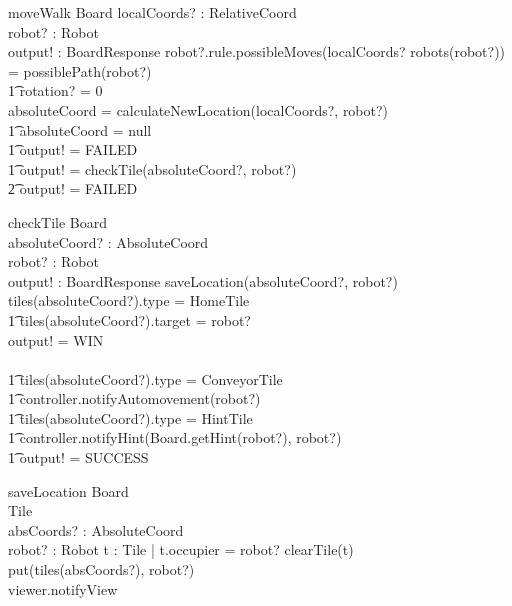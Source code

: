 \documentclass[a4paper,11pt]{article}
\begin{document}
\begin{schema}{moveWalk}
\Delta Board
localCoords? : RelativeCoord \\
robot? : Robot \\
output! : BoardResponse
\where
\IF robot?.rule.possibleMoves(localCoords? \cross robots(robot?)) = possiblePath(robot?) \\ \t1
rotation? = 0 \\
\THEN absoluteCoord = calculateNewLocation(localCoords?, robot?)\\ \t1
\IF absoluteCoord = null \\ \t1
\THEN output! = FAILED \\ \t1
\ELSE output! = checkTile(absoluteCoord?, robot?)\\ \t2
\ELSE output! = FAILED
\end{schema}

\begin{schema}{checkTile}
\Delta Board \\
absoluteCoord? : AbsoluteCoord \\
robot? : Robot \\
output! : BoardResponse
\where
saveLocation(absoluteCoord?, robot?) \\ 
\IF tiles(absoluteCoord?).type = HomeTile \\ \t1
tiles(absoluteCoord?).target = robot? \\ 
\THEN output! = WIN \\ \
\ELSE  \\ \t1
\IF tiles(absoluteCoord?).type = ConveyorTile \\ \t1
\THEN controller.notifyAutomovement(robot?) \\ \t1
\IF tiles(absoluteCoord?).type = HintTile \\ \t1
\THEN controller.notifyHint(Board.getHint(robot?), robot?) \\ \t1
output! = SUCCESS
\end{schema}

\begin{schema}{saveLocation}
\Xi Board \\
\Delta Tile \\
absCoords? : AbsoluteCoord \\
robot? : Robot
\where
\exists t : Tile | t.occupier = robot? \implies clearTile(t)\\
put(tiles(absCoords?), robot?) \\
viewer.notifyView
\end{schema}
\end{document}
